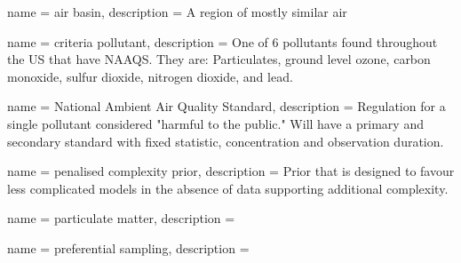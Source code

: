 

{
    name = {air basin},
    description = {A region of mostly similar air}
}

{
    name = {criteria pollutant},
    description = {One of 6 pollutants found throughout the US that have NAAQS.  They are: Particulates, ground level ozone, carbon monoxide, sulfur dioxide, nitrogen dioxide, and lead.}
}

{
    name = {National Ambient Air Quality Standard},
    description = {Regulation for a single pollutant considered "harmful to the public." Will have a primary and secondary standard with fixed statistic, concentration and observation duration. }
}

{
    name = {penalised complexity prior},
    description = {Prior that is designed to favour less complicated models in the absence of data supporting additional complexity. \cite{simpson2017penalising} }
}

{
    name = {particulate matter},
    description = {}
}

{
    name = {preferential sampling},
    description = {}
}



